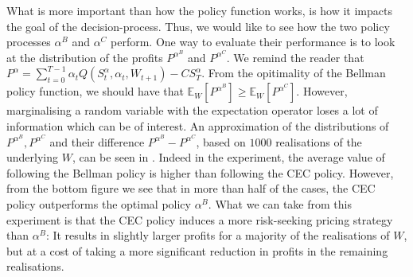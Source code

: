\documentclass[main.tex]{subfiles}
\begin{document}
What is more important than how the policy function works, is how it
impacts the goal of the decision-process. Thus, we would like to see
how the two policy processes $\alpha^B$ and $\alpha^C$ perform.
One way to evaluate their performance is to look at
the distribution of the profits $P^{\alpha^B}$ and $P^{\alpha^C}$.
We remind the reader that
$P^\alpha =
\sum_{t=0}^{T-1}\alpha_tQ(S_t^\alpha,\alpha_t,W_{t+1})-CS_T^\alpha$.
From the opitimality of the Bellman policy function, we should have
that $\mathbb E_W[P^{\alpha^B}]\geq \mathbb E_W[P^{\alpha^C}]$.
However, marginalising a random variable with the expectation operator
loses a lot of information which can be of interest.
An approximation of the distributions of $P^{\alpha^B}, P^{\alpha^C}$
and their difference
$P^{\alpha^B}-P^{\alpha^C}$, based on $1000$ realisations of the
underlying $W$, can be seen in .
Indeed in the experiment, the average value of following the
Bellman policy is higher than following the CEC policy.
However, from the bottom figure we see that
in more than half of the cases, the CEC policy outperforms the optimal
policy $\alpha^B$. What we can take from this experiment is that
the CEC policy induces a more risk-seeking pricing strategy than
$\alpha^B$: It results in slightly larger profits for a majority of the
realisations of $W$, but at a cost of taking a more significant
reduction in
profits in the remaining realisations.
\end{document}
